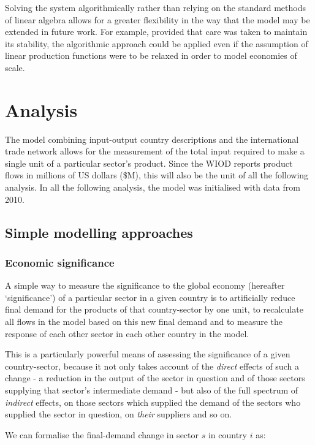 \documentclass[a4paper]{article}
\begin{document}
Solving the system algorithmically rather than relying on the standard methods of linear algebra allows for a greater flexibility in the way that the model may be extended in future work. For example, provided that care was taken to maintain its stability, the algorithmic approach could be applied even if the assumption of linear production functions were to be relaxed in order to model economies of scale.


\section{Analysis}\label{sec:analysis}
The model combining input-output country descriptions and the international trade network allows for the measurement of the total input required to make a single unit of a particular sector's product.
Since the WIOD reports product flows in millions of US dollars (\$M), this will also be the unit of all the following analysis.
In all the following analysis, the model was initialised with data from 2010.

\subsection{Simple modelling approaches}
\label{ss_simple_modelling_approaches}

\subsubsection*{Economic significance}
A simple way to measure the significance to the global economy (hereafter `significance') of a particular sector in a given country is to artificially reduce final demand for the products of that country-sector by one unit, to recalculate all flows in the model based on this new final demand and to measure the response of each other sector in each other country in the model.

This is a particularly powerful means of assessing the significance of a given country-sector, because it not only takes account of the \textit{direct} effects of such a change - a reduction in the output of the sector in question and of those sectors supplying that sector's intermediate demand - but also of the full spectrum of \textit{indirect} effects, on those sectors which supplied the demand of the sectors who supplied the sector in question, on \textit{their} suppliers and so on.

We can formalise the final-demand change in sector $s$ in country $i$ as:
\end{document}
